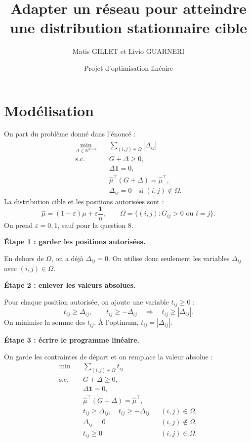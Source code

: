 \documentclass[11pt,a4paper]{article}
\title{Adapter un réseau pour atteindre une distribution stationnaire cible}
\author{Matis GILLET et Livio GUARNERI}
\date{Projet d'optimisation linéaire}
\begin{document}
\maketitle

\section{Modélisation}
On part du problème donné dans l'énoncé :
\begin{align*}
 \min_{\Delta\in\mathbb R^{n\times n}}\quad
 &\sum_{(i,j)\in\Omega}|\Delta_{ij}|\\
 \text{s.c.}\quad
 &G+\Delta\geq0,\\
 &\Delta\mathbf 1=0,\\
 &\widehat\mu^\top(G+\Delta)=\widehat\mu^\top,\\
 &\Delta_{ij}=0\quad\text{si }(i,j)\notin\Omega.
\end{align*}
La distribution cible et les positions autorisées sont :
\[
 \widehat\mu=(1-\varepsilon)\mu+\varepsilon\frac{\mathbf 1}{n},
 \qquad
 \Omega=\{(i,j):G_{ij}>0\text{ ou }i=j\}.
\]
On prend \(\varepsilon=0{,}1\), sauf pour la question 8.

\medskip
\noindent\textbf{Étape 1 : garder les positions autorisées.}\par\nobreak\smallskip
En dehors de \(\Omega\), on a déjà \(\Delta_{ij}=0\).
On utilise donc seulement les variables \(\Delta_{ij}\) avec
\((i,j)\in\Omega\).

\medskip
\noindent\textbf{Étape 2 : enlever les valeurs absolues.}\par\nobreak\smallskip
Pour chaque position autorisée, on ajoute une variable \(t_{ij}\geq0\) :
\[
 t_{ij}\geq\Delta_{ij},\qquad t_{ij}\geq-\Delta_{ij}
 \quad\Longrightarrow\quad t_{ij}\geq|\Delta_{ij}|.
\]
On minimise la somme des \(t_{ij}\). À l'optimum,
\(t_{ij}=|\Delta_{ij}|\).

\medskip
\noindent\textbf{Étape 3 : écrire le programme linéaire.}\par\nobreak\smallskip
On garde les contraintes de départ et on remplace la valeur absolue :
\begin{align*}
 \min\quad &\sum_{(i,j)\in\Omega}t_{ij}\\
 \text{s.c.}\quad
 &G+\Delta\geq0,\\
 &\Delta\mathbf 1=0,\\
 &\widehat\mu^\top(G+\Delta)=\widehat\mu^\top,\\
 &t_{ij}\geq\Delta_{ij},\quad t_{ij}\geq-\Delta_{ij}
 &&(i,j)\in\Omega,\\
 &\Delta_{ij}=0 &&(i,j)\notin\Omega,\\
 &t_{ij}\geq0 &&(i,j)\in\Omega.
\end{align*}
\end{document}
